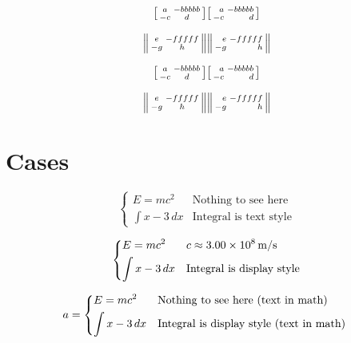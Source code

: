 \documentclass{article}
\begin{document}
\[
\begin{bsmallmatrix*} a & -bbbbb \\ -c & d \end{bsmallmatrix*}
\begin{bsmallmatrix*}[r] a & -bbbbb \\ -c & d \end{bsmallmatrix*}
\]

\[
\begin{Vsmallmatrix*} e & -fffff \\ -g & h \end{Vsmallmatrix*}
\begin{Vsmallmatrix*}[r] e & -fffff \\ -g & h \end{Vsmallmatrix*}
\]


\[
\begin{bsmallmatrix*} a & -bbbbb \\ -c & d \end{bsmallmatrix*}
\begin{bsmallmatrix*}[r] a & -bbbbb \\ -c & d \end{bsmallmatrix*}
\]

\[
\begin{Vsmallmatrix*} e & -fffff \\ -g & h \end{Vsmallmatrix*}
\begin{Vsmallmatrix*}[r] e & -fffff \\ -g & h \end{Vsmallmatrix*}
\]

\section{Cases}

\[
\begin{cases}
E = m c^2 & \text{Nothing to see here} \\
\int x-3\, dx & \text{Integral is text style}
\end{cases}
\]

\[
\begin{dcases}
E = m c^2 & c \approx 3.00\times 10^{8}\,\mathrm{m}/\mathrm{s} \\
\int x-3\, dx & \text{Integral is display style}
\end{dcases}
\]

\[
a= \begin{dcases*}
E = m c^2 & Nothing to see here (text in math) \\
\int x-3\, dx & Integral is display style (text in math)
\end{dcases*}
\]
\end{document}
